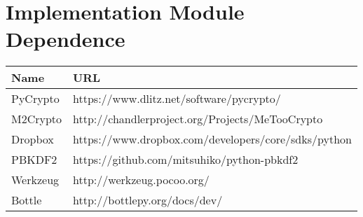 \chapter{Implementation Module Dependence}

\begin{tabular}{p{40mm}|p{100mm}}
	\textbf{Name}&\textbf{URL}\\
	\hline
    PyCrypto&https://www.dlitz.net/software/pycrypto/ \\
    M2Crypto&http://chandlerproject.org/Projects/MeTooCrypto \\
    Dropbox&https://www.dropbox.com/developers/core/sdks/python \\
    PBKDF2&https://github.com/mitsuhiko/python-pbkdf2 \\
    Werkzeug&http://werkzeug.pocoo.org/ \\
    Bottle&http://bottlepy.org/docs/dev/
\end{tabular} 